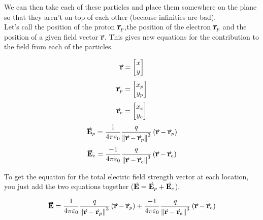 \documentclass[main.tex]{subfiles}
\begin{document}
                We can then take each of these particles and place them somewhere on the plane so that they aren't on top of each other (because infinities are bad).\\
                Let's call the position of the proton $\vect{r}_p$,the position of the electron $\vect{r}_p$ and the position of a given field vector $\vect{r}$.
                This gives new equations for the contribution to the field from each of the particles.

                \begin{equation*}
                    \vect{r} = \Matrix{x\\y}
                \end{equation*}
                \begin{equation*}
                    \vect{r}_p = \Matrix{x_p\\y_p}
                \end{equation*}
                \begin{equation*}
                    \vect{r}_e = \Matrix{x_e\\y_e}
                \end{equation*}
                \begin{equation}
                    \vect{E}_p = \frac{1}{4\pi\varepsilon_0}\frac{q}{\vmod{\vect{r} - \vect{r}_p}^3}\left(\vect{r} - \vect{r}_p\right)
                    \label{eq: Proton Electric Field Re-Centred}
                \end{equation}
                \begin{equation}
                    \vect{E}_e = \frac{-1}{4\pi\varepsilon_0}\frac{q}{\vmod{\vect{r} - \vect{r}_e}^3}\left(\vect{r} - \vect{r}_e\right)
                    \label{eq: Electron Electric Field Re-Centred}
                \end{equation}
                

                To get the equation for the total electric field strength vector at each location, you just add the two equations together ($\vect{E} =\vect{E}_p + \vect{E}_e$).
                
                \begin{equation}
                    \vect{E} = \frac{1}{4\pi\varepsilon_0}\frac{q}{\vmod{\vect{r} - \vect{r}_p}^3}\left(\vect{r} - \vect{r}_p\right) + \frac{-1}{4\pi\varepsilon_0}\frac{q}{\vmod{\vect{r} - \vect{r}_e}^3}\left(\vect{r} - \vect{r}_e\right)
                    \label{eq: Total Electric Vector Field}
                \end{equation}
\end{document}
